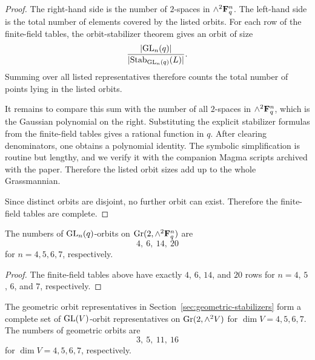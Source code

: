 \begin{proof}
The right-hand side is the number of \(2\)-spaces in \(\wedge^2 \mathbf F_q^n\). The
left-hand side is the total number of elements covered by the listed orbits.
For each row of the finite-field tables, the orbit-stabilizer theorem gives an
orbit of size
\[
  \frac{|\mathrm{GL}_n(q)|}{|\mathrm{Stab}_{\mathrm{GL}_n(q)}(L)|}.
\]
Summing over all listed representatives therefore counts the total number of
points lying in the listed orbits.

It remains to compare this sum with the number of all \(2\)-spaces in
\(\wedge^2\mathbf F_q^n\), which is the Gaussian polynomial on the right. Substituting
the explicit stabilizer formulas from the finite-field tables gives a rational
function in \(q\). After clearing denominators, one obtains a polynomial
identity. The symbolic simplification is routine but lengthy, and we verify it
with the companion Magma scripts archived with the paper. Therefore the listed
orbit sizes add up to the whole Grassmannian.

Since distinct orbits are disjoint, no further orbit can exist. Therefore the
finite-field tables are complete.
\end{proof}

\begin{corollary}
\label{cor:finite-counts-rewrite}
The numbers of \(\mathrm{GL}_n(q)\)-orbits on \(\mathrm{Gr}(2,\wedge^2 \mathbf F_q^n)\) are
\[
  4,\ 6,\ 14,\ 20
\]
for \(n=4,5,6,7\), respectively.
\end{corollary}

\begin{proof}
The finite-field tables above have exactly \(4\), \(6\), \(14\), and \(20\)
rows for \(n=4\), \(5\), \(6\), and \(7\), respectively.
\end{proof}

\begin{corollary}
\label{cor:geometric-list-complete-rewrite}
The geometric orbit representatives in
Section~\ref{sec:geometric-stabilizers} form a complete set of
\(\mathrm{GL}(V)\)-orbit representatives on \(\mathrm{Gr}(2,\wedge^2 V)\) for \(\dim V=4,5,6,7\).
The numbers of geometric orbits are
\[
  3,\ 5,\ 11,\ 16
\]
for \(\dim V=4,5,6,7\), respectively.
\end{corollary}


